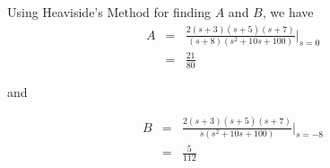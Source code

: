 \documentclass[12pt, a4paper]{article}
\begin{document}
		Using Heaviside's Method for finding $A$ and $B$, we have
		\[
			\begin{array}{rcl}
				A & = & \frac{2(s+3)(s+5)(s+7)}{(s+8)(s^2 + 10s + 100)}\bigg\rvert_{s=0} \\
				& = & \frac{21}{80}
			\end{array}
		\]

		and

		\[
			\begin{array}{rcl}
				B & = & \frac{2(s+3)(s+5)(s+7)}{s(s^2 + 10s + 100)}\bigg\rvert_{s=-8} \\
				& = & \frac{5}{112}
			\end{array}
		\]
\end{document}
